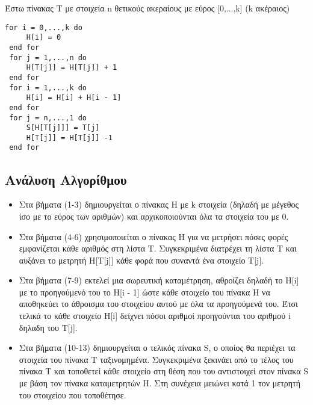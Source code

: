 \documentclass[a4paper]{article}
\begin{document}

\begin{tcolorbox}[colback=blue!20!white,colframe=purple!60!white,title=\textbf{Algorithm 1}]
Έστω πίνακας T με στοιχεία n θετικούς ακεραίους με εύρος [0,...,k] (k ακέραιος)
\begin{lstlisting}[mathescape]
 for i = 0,...,k do
	 H[i] = 0
 end for
 for j = 1,...,n do
	 H[T[j]] = H[T[j]] + 1
 end for
 for i = 1,...,k do
	 H[i] = H[i] + H[i - 1]
 end for
 for j = n,...,1 do
	 S[H[T[j]]] = T[j]
	 H[T[j]] = H[T[j]] -1
 end for
\end{lstlisting}
\end{tcolorbox}

\subsection*{Ανάλυση Αλγορίθμου}
\begin{itemize}
\item Στα βήματα (1-3) δημιουργείται ο πίνακας H με k στοιχεία (δηλαδή  με μέγεθος ίσο με το εύρος των αριθμών) και αρχικοποιούνται όλα τα στοιχεία του με 0.
\item Στα βήματα (4-6) χρησιμοποιείται ο πίνακας H για να μετρήσει πόσες φορές εμφανίζεται κάθε αριθμός στη λίστα T. Συγκεκριμένα διατρέχει τη λίστα T και αυξάνει το μετρητή H[T[j]] κάθε φορά που συναντά ένα στοιχείο T[j].
\item Στα βήματα (7-9) εκτελεί μια σωρευτική καταμέτρηση, αθροίζει δηλαδή το H[i] με το προηγούμενό του το H[i - 1] ώστε κάθε στοιχείο του πίνακα H να αποθηκεύει το άθροισμα του στοιχείου αυτού με όλα τα προηγούμενά του. Έτσι τελικά το κάθε στοιχείο H[i] δείχνει πόσοι αριθμοί προηγούνται του αριθμού i δηλαδη του T[j].
\item Στα βήματα (10-13) δημιουργείται ο τελικός πίνακα S, ο οποίος θα περιέχει τα στοιχεία του πίνακα T ταξινομημένα. Συγκεκριμένα ξεκινάει από το τέλος του πίνακα T και τοποθετεί κάθε στοιχείο στη θέση που του αντιστοιχεί στον πίνακα S με βάση τον πίνακα καταμετρητών H. Στη συνέχεια μειώνει κατά 1 τον μετρητή του στοιχείου που τοποθέτησε.
\end{itemize}

\pagebreak
\end{document}
